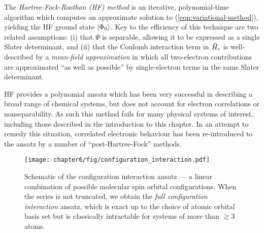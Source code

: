 The \emph{Hartree-Fock-Roothan (HF) method} is an iterative, polynomial-time algorithm which computes an approximate solution to (\ref{eqn:variational-method}), yielding the HF ground state $\mbox{$ | \Phi_0 \rangle $}$.  Key to the efficiency of this technique are two related assumptions: (i) that $\Psi$ is separable, allowing it to be expressed as a single Slater determinant,  and (ii) that the Coulomb interaction term in $\hat{H}_e$ is well-described by a \emph{mean-field approximation} in which all two-electron contributions are approximated ``as well as possible'' by single-electron terms in the same Slater determinant.  

HF provides a polynomial ansatz which has been very successful in describing a broad range of chemical systems, but does not account for electron correlations or nonseparability. As such this method fails for many physical systems of interest, including those described in the introduction to this chapter. In an attempt to remedy this situation, correlated electronic behaviour has been re-introduced to the ansatz by a number of ``post-Hartree-Fock'' methods. 

\begin{figure}[t!]
\centering
\texttt{[image: chapter6/fig/configuration\_interaction.pdf]}
\caption[Configuration interaction ansatz]{
Schematic of the configuration interaction ansatz --- a linear combination of possible molecular spin orbital configurations. When the series is not truncated, we obtain the \emph{full configuration interaction} ansatz, which is exact up to the choice of atomic orbital basis set but is classically intractable for systems of more than $\gtrsim 3$ atoms.
}
\label{fig:configuration-interaction}
\end{figure}


